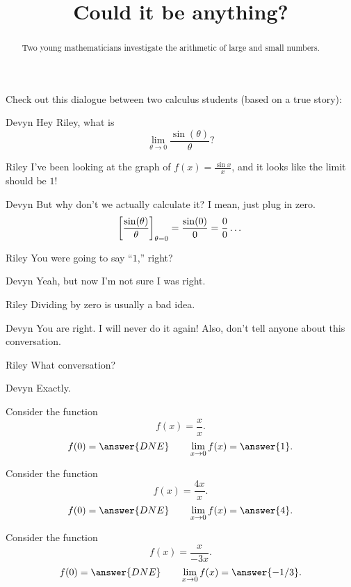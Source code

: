 \documentclass{ximera}
\title[Break-Ground:]{Could it be anything?}
\begin{document}
\begin{abstract}
Two young mathematicians investigate the arithmetic of large
and small numbers.
\end{abstract}
\maketitle


Check out this dialogue between two calculus students (based on a true
story):


\begin{dialogue}
\item[Devyn] Hey Riley, what is
  \[
  \lim_{\theta\to 0}\frac{\sin(\theta)}{\theta}?
  \]
\item[Riley] I've been looking at the graph of $f(x) = \frac{\sin x}{x}$, and it looks like the limit should be $1$!
\item[Devyn] But why don't we actually calculate it? I mean, just plug in zero. 
  \[
  \bigg[ \frac{\sin(\theta)}{\theta} \bigg]_{\theta=0} = \frac{\sin(0)}{0}=\frac{0}{0}\dots
  \]
  \item[Riley] You were going to say ``$1$,'' right? 
  \item[Devyn] Yeah, but now I'm not sure I was right.
  \item[Riley] Dividing by zero is usually a bad idea.
  \item[Devyn] You are right. I will never do it again! Also, don't
    tell anyone about this conversation.
  \item[Riley] What conversation?
  \item[Devyn] Exactly.
\end{dialogue}



\begin{problem}
  Consider the function
  \[
  f(x) = \frac{x}{x}.
  \]
  \[
  f(0) = \answer{DNE}\qquad\lim_{x\to 0} f(x) = \answer{1}.
  \]
\end{problem}

\begin{problem}
  Consider the function
  \[
  f(x) = \frac{4x}{x}.
  \]
  \[
  f(0) = \answer{DNE}\qquad\lim_{x\to 0} f(x) = \answer{4}.
  \]
\end{problem}

\begin{problem}
  Consider the function
  \[
  f(x) = \frac{x}{-3x}.
  \]
  \[
  f(0) = \answer{DNE}\qquad\lim_{x\to 0} f(x) = \answer{-1/3}.
  \]
\end{problem}


\end{document}
